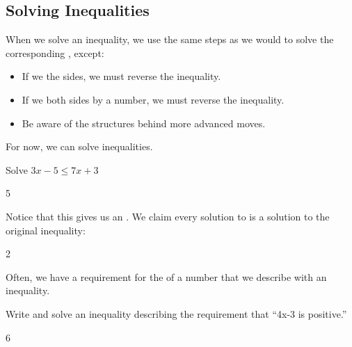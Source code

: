 \subsection{Solving Inequalities} 
\begin{displaybox}
When we solve an inequality, we use the same steps as we would to solve the corresponding \makeblank[1.5in], except:
\begin{itemize}
\item If we \makeblank[1in] the sides, we must reverse the inequality.
\item If we \makeblank[1.5in] both sides by a \makeblank[1.5in] number, we must reverse the inequality.
\item Be aware of the structures behind more advanced moves.
\end{itemize}
\end{displaybox}
For now, we can solve \makeblank[1in] inequalities.
\begin{Example}
Solve $3x-5\leq 7x+3$
\begin{cpic}{}{5}
\end{cpic}
Notice that this gives us an \makeblank[1.5in]. We claim every solution to \makeblank[1in] is a solution to the original inequality:
\begin{cpic}{}{2}
\end{cpic}
\end{Example}
Often, we have a requirement for the \makeblank[1in] of a number that we describe with an inequality.
\begin{Example}
Write and solve an inequality describing the requirement that ``4x-3 is positive.''
\begin{cpic}{}{6}
\end{cpic}
\end{Example}